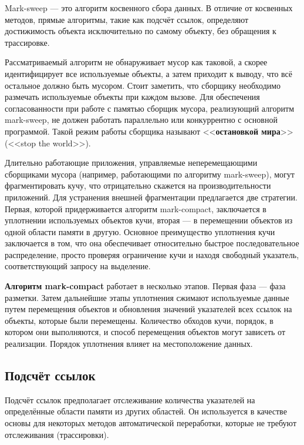 Mark-sweep --- это алгоритм косвенного сбора данных. В отличие от косвенных методов, прямые алгоритмы, такие как подсчёт ссылок, определяют достижимость объекта исключительно по самому объекту, без обращения к трассировке. ~\cite{handbook}

Рассматриваемый алгоритм не обнаруживает мусор как таковой, а скорее идентифицирует все используемые объекты, а затем приходит к выводу, что всё остальное должно быть мусором. Стоит заметить, что сборщику необходимо размечать используемые объекты при каждом вызове. Для обеспечения согласованности при работе с памятью сборщик мусора, реализующий алгоритм mark-sweep, не должен работать параллельно или конкуррентно с основной программой. Такой режим работы сборщика называют <<\textbf{остановкой мира}>> (<<stop the world>>).~\cite{handbook}

Длительно работающие приложения, управляемые неперемещающими сборщиками мусора (например, работающими по алгоритму mark-sweep), могут фрагментировать кучу, что отрицательно скажется на производительности приложений. Для устранения внешней фрагментации предлагается две стратегии. Первая, которой придерживается алгоритм mark-compact, заключается в уплотнении используемых объектов кучи, вторая --- в перемещении объектов из одной области памяти в другую. Основное преимущество уплотнения кучи заключается в том, что она обеспечивает относительно быстрое последовательное распределение, просто проверяя ограничение кучи и находя свободный указатель, соответствующий запросу на выделение.~\cite{handbook}

\textbf{Алгоритм mark-compact} работает в несколько этапов. Первая фаза --- фаза разметки. Затем дальнейшие
этапы уплотнения сжимают используемые данные путем перемещения объектов и обновления значений указателей всех ссылок на объекты, которые были перемещены. Количество обходов кучи, порядок, в котором они выполняются, и способ перемещения объектов могут зависеть от реализации. Порядок уплотнения влияет на местоположение данных.~\cite{handbook}




\subsection*{Подсчёт ссылок}

Подсчёт ссылок предполагает отслеживание количества указателей на определённые области памяти из других областей. Он используется в качестве основы для некоторых методов автоматической переработки, которые не требуют отслеживания (трассировки).~\cite{recycling}

